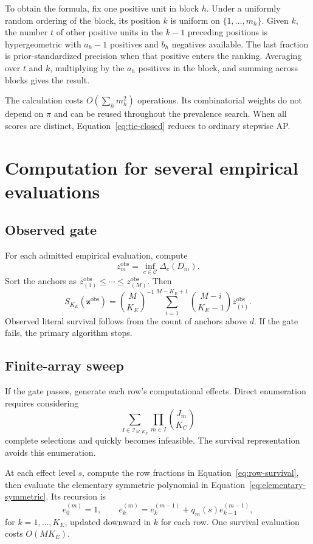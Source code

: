 \documentclass[11pt]{article}
\newcommand{\CSet}{\mathcal{C}}
\theoremstyle{remark}
\begin{document}
To obtain the formula, fix one positive unit in block $h$. Under a uniformly
random ordering of the block, its position $k$ is uniform on
$\{1,\ldots,m_h\}$. Given $k$, the number $t$ of other positive units in the
$k-1$ preceding positions is hypergeometric with $a_h-1$ positives and $b_h$
negatives available. The last fraction is prior-standardized precision when
that positive enters the ranking. Averaging over $t$ and $k$, multiplying by
the $a_h$ positives in the block, and summing across blocks gives the result.

The calculation costs $O(\sum_hm_h^2)$ operations. Its combinatorial weights
do not depend on $\pi$ and can be reused throughout the prevalence search. When
all scores are distinct, Equation~\eqref{eq:tie-closed} reduces to ordinary
stepwise AP.


\section{Computation for several empirical evaluations}
\label{app:computation}

\subsection{Observed gate}

For each admitted empirical evaluation, compute
\[
z_m^{\mathrm{obs}}
=
\inf_{c\in\CSet}\Delta_c(D_m).
\]
Sort the anchors as
$z_{(1)}^{\mathrm{obs}}\leq\cdots\leq z_{(M)}^{\mathrm{obs}}$. Then
\begin{equation}
S_{K_E}(\mathbf z^{\mathrm{obs}})
=
\binom{M}{K_E}^{-1}
\sum_{i=1}^{M-K_E+1}
\binom{M-i}{K_E-1}z_{(i)}^{\mathrm{obs}}.
\label{eq:sorted-observed}
\end{equation}
Observed literal survival follows from the count of anchors above $d$. If the
gate fails, the primary algorithm stops.

\subsection{Finite-array sweep}

If the gate passes, generate each row's computational effects. Direct
enumeration requires considering
\[
\sum_{I\in\mathcal I_{M,K_E}}
\prod_{m\in I}\binom{J_m}{K_C}
\]
complete selections and quickly becomes infeasible. The survival
representation avoids this enumeration.

At each effect level $s$, compute the row fractions in
Equation~\eqref{eq:row-survival}, then evaluate the elementary symmetric
polynomial in Equation~\eqref{eq:elementary-symmetric}. Its recursion is
\begin{equation}
e_0^{(m)}=1,
\qquad
e_k^{(m)}
=
e_k^{(m-1)}+q_m(s)e_{k-1}^{(m-1)},
\label{eq:symmetric-recursion}
\end{equation}
for $k=1,\ldots,K_E$, updated downward in $k$ for each row. One survival
evaluation costs $O(MK_E)$.
\end{document}
